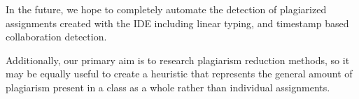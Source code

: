 \documentclass[10pt]{article}
\begin{document}
In the future, we hope to completely automate the detection of plagiarized assignments created with the IDE including linear typing, and timestamp based collaboration detection.

Additionally, our primary aim is to research plagiarism reduction methods, so it may be equally useful to create a heuristic that represents the general amount of plagiarism present in a class as a whole rather than individual assignments.





\balance


\end{document}
